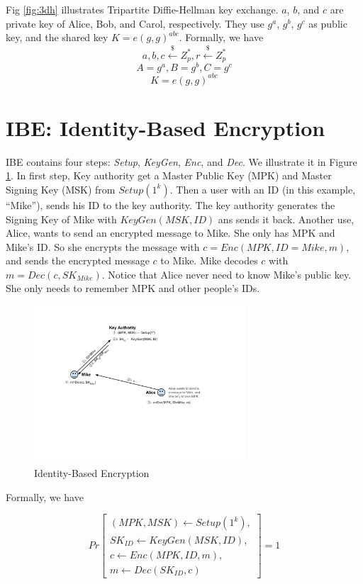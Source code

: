 Fig \ref{fig:3dh} illustrates Tripartite Diffie-Hellman key exchange. $a$, $b$, and $c$ are private key of Alice, Bob, and Carol, respectively.
They use $g^a$, $g^b$, $g^c$ as public key, and the shared key $K=e(g,g)^{abc}$.
Formally, we have
$$a,b,c \stackrel{\$}{\gets} Z^*_p, r \stackrel{\$}{\gets} Z^*_p$$
$$A=g^a, B=g^b, C=g^c$$
$$K=e(g,g)^{abc}$$



\section{IBE: Identity-Based Encryption}
IBE contains four steps: \emph{Setup}, \emph{KeyGen}, \emph{Enc}, and \emph{Dec}. We illustrate it in Figure \ref{fig:ibe}.
In first step, Key authority get a Master Public Key (MPK) and Master Signing Key (MSK) from $Setup(1^k)$. Then a user with an ID
 (in this example, ``Mike''), sends his ID to the key authority. The key authority generates the Signing Key of Mike with $KeyGen(MSK, ID)$ ans sends it back. Another use, Alice, wants to send an encrypted message to Mike. She only has MPK and Mike's ID. So she encrypts the message with $c=Enc(MPK, ID=Mike, m)$, and sends the encrypted message $c$ to Mike. Mike decodes $c$ with $m=Dec(c, SK_{Mike})$. Notice that Alice never need to know Mike's public key. She only needs to remember MPK and other people's IDs.

\begin{figure}[H]
\label{fig:ibe}
\centering
  \includegraphics[width=0.7\textwidth]{fig3.pdf}
\caption{Identity-Based Encryption}
\end{figure}

Formally, we have

$$Pr\begin{bmatrix}
       (MPK, MSK) \gets Setup(1^k), \\[0.3em]
       SK_{ID} \gets KeyGen(MSK, ID), \\[0.3em]
       c \gets Enc(MPK, ID, m), \\[0.3em]
       m \gets Dec(SK_{ID}, c)
     \end{bmatrix}
      =1$$


